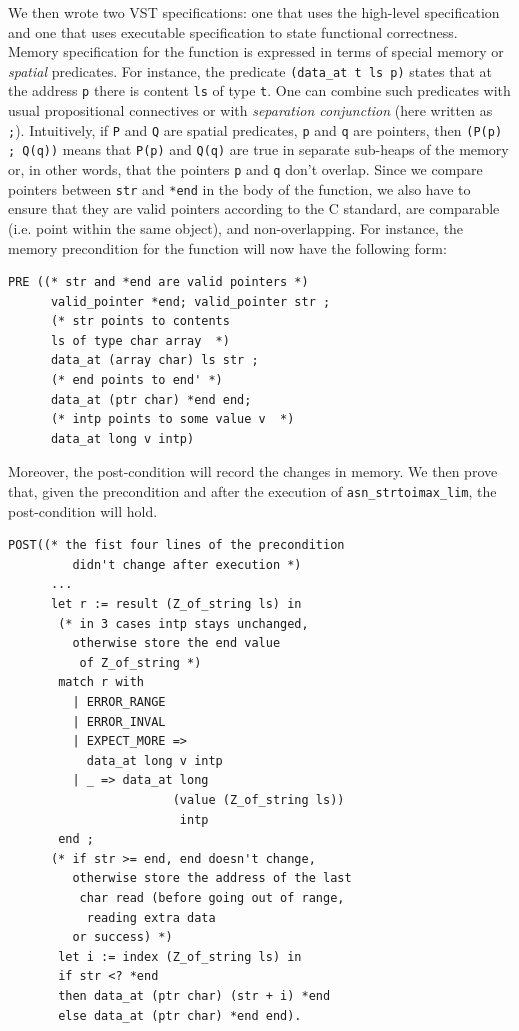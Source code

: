\documentclass[10p,conference]{IEEEtran}
\begin{document}
 We then wrote two VST specifications: one that uses the high-level specification
 and one that uses executable specification to state functional correctness. Memory specification for the function is expressed in terms of special memory or \emph{spatial}
 predicates. For instance, the predicate \texttt{(data\_at t ls p)}
 states that at the address \texttt{p} there is content \texttt{ls} of
 type \texttt{t}. One can combine such predicates with usual propositional connectives or with \emph{separation conjunction}
 (here written as \texttt{;}). Intuitively, if \texttt{P} and \texttt{Q} are spatial predicates, \texttt{p} and \texttt{q} are pointers, then  \texttt{(P(p) ; Q(q))} means that \texttt{P(p)} and \texttt{Q(q)} are true in separate sub-heaps of the memory or, in other words, that the pointers \texttt{p} and \texttt{q} don't overlap. Since we compare pointers between \texttt{str} and \texttt{*end} in the body of the function, we also have to ensure
 that they are valid pointers according to the C standard, are
 comparable (i.e. point within the same object), and non-overlapping. For instance, the
 memory precondition for the function will now have the following form:
\begin{lstlisting}[language=Coq]
PRE ((* str and *end are valid pointers *)
      valid_pointer *end; valid_pointer str ;
      (* str points to contents 
      ls of type char array  *)
      data_at (array char) ls str ; 
      (* end points to end' *)
      data_at (ptr char) *end end;
      (* intp points to some value v  *)
      data_at long v intp)
     \end{lstlisting}

     Moreover, the post-condition will record the changes in memory. We then
     prove that, given the precondition and after the execution of
     \texttt{asn\_strtoimax\_lim}, the post-condition will hold.
           
\begin{lstlisting}[language=Coq]
 POST((* the fist four lines of the precondition 
         didn't change after execution *)
      ... 
      let r := result (Z_of_string ls) in
       (* in 3 cases intp stays unchanged,
         otherwise store the end value
          of Z_of_string *)
       match r with 
         | ERROR_RANGE 
         | ERROR_INVAL 
         | EXPECT_MORE => 
           data_at long v intp
         | _ => data_at long 
                       (value (Z_of_string ls))
                        intp 
       end ;
      (* if str >= end, end doesn't change, 
         otherwise store the address of the last
          char read (before going out of range,
           reading extra data 
         or success) *)
       let i := index (Z_of_string ls) in
       if str <? *end
       then data_at (ptr char) (str + i) *end
       else data_at (ptr char) *end end).
\end{lstlisting}
\end{document}
